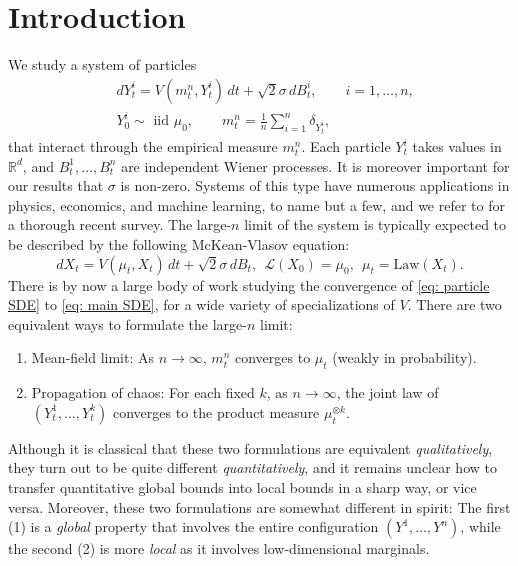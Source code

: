 \documentclass[11pt,reqno]{amsart}
\numberwithin{equation}{section}
\theoremstyle{definition}
\def\R{{\mathbb R}}
\def\Law{\mathcal{L}}
\begin{document}
\section{Introduction}
We study a system of particles 
\begin{equation}
\label{eq: particle SDE}
    \begin{split}
        &dY_t^i= V(m_t^n,Y_t^i)\,dt+\sqrt2 \sigma \, dB_t^i, \qquad i=1,\dots,n, \\
        &Y_0^i \sim \text{ iid }  \mu_0 , \qquad m_t^n= \frac 1n\sum_{i=1}^n \delta_{Y_t^i},
    \end{split}
\end{equation}
that interact through the empirical measure $m_t^n$. Each particle $Y_t^i$ takes values in $\R^d$, and $B_t^1,\dots,B_t^n$ are independent Wiener processes. It is moreover important for our results that $\sigma$ is non-zero.  Systems of this type have numerous applications in physics, economics, and machine learning, to name but a few, and we refer to \cite{ChaintronChaos1,ChaintronChaos2} for a thorough recent survey.
The large-$n$ limit of the system is typically expected to be described by the following McKean-Vlasov equation: 
\begin{equation}    \label{eq: main SDE}
dX_t=  V(\mu_t,X_t)\,dt+\sqrt 2 \sigma \,dB_t,  \ \ \Law(X_0)= \mu_0, \ \ \mu_t=\mathrm{Law}(X_t).
\end{equation}
There is by now a large body of work studying the convergence of \eqref{eq: particle SDE} to \eqref{eq: main SDE}, for a wide variety of specializations of $ V$. There are two equivalent ways to formulate the large-$n$ limit:
\begin{enumerate}
\item Mean-field limit: As $n\to\infty$, $m^n_t$ converges to $\mu_t$ (weakly in probability).
\item Propagation of chaos: For each fixed $k$, as $n\to\infty$, the joint law of $(Y_t^1,\dots,Y_t^k)$ converges to the product measure $\mu_t^{\otimes k}$.
\end{enumerate}
Although it is classical that these two formulations are equivalent \emph{qualitatively}, they turn out to be quite different \emph{quantitatively}, and it remains unclear how to transfer quantitative global bounds into local bounds in a sharp way, or vice versa.
Moreover, these two formulations are somewhat different in spirit: The first (1) is a \emph{global} property that involves  the entire configuration $(Y^1,\dots,Y^n)$, while the second (2) is more \emph{local} as it involves low-dimensional marginals.
\end{document}
